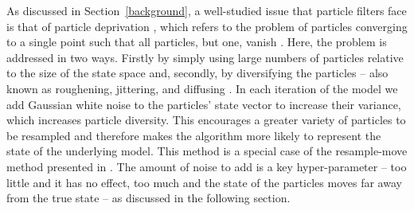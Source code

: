 As discussed in Section~\ref{background}, a well-studied issue that particle filters face is that of particle deprivation \citep{snyder_obstacles_2008}, which refers to the problem of particles converging to a single point such that all particles, but one, vanish \citep{kong_sequential_1994}.  
Here, the problem is addressed in two ways. Firstly by simply using large numbers of particles relative to the size of the state space and, secondly, by diversifying the particles \citep{vadakkepat_improved_2006} -- also known as roughening, jittering, and diffusing \citep{li_fight_2014, shephard_learning_2009, pantrigo_combining_2005}. In each iteration of the model we add Gaussian white noise to the particles' state vector to increase their variance, which increases particle diversity. This encourages a greater variety of particles to be resampled and therefore makes the algorithm more likely to represent the state of the underlying model. This method is a special case of the resample-move method presented in \citep{gilks_following_2001}. The amount of noise to add is a key hyper-parameter -- too little and it has no effect, too much and the state of the particles moves far away from the true state -- as discussed in the following section. 
